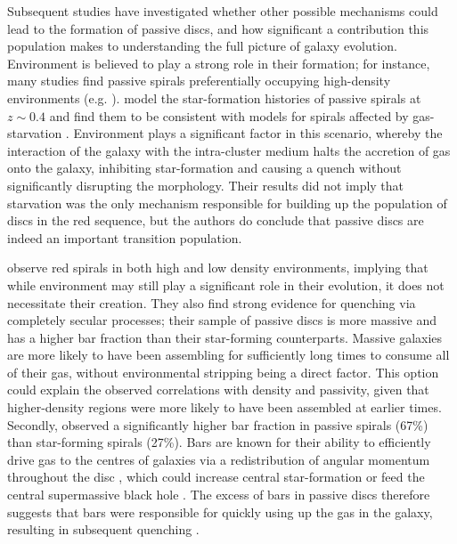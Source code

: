 \documentclass[useAMS,usenatbib]{mn2e}
\begin{document}
Subsequent studies have investigated whether other possible mechanisms could lead to the formation of passive discs, and how significant a contribution this population makes to understanding the full picture of galaxy evolution. Environment is believed to play a strong role in their formation; for instance, many studies find passive spirals preferentially occupying high-density environments (e.g. \citet{Dressler1999, Poggianti1999, Goto2003, Deng2009, Hughes2009, Fraser-McKelvie2017}). \citet{Moran2006} model the star-formation histories of passive spirals at $z\sim0.4$ and find them to be consistent with models for spirals affected by gas-starvation \citep{Larson1980, Quilis2000, Bekki2002}. Environment plays a significant factor in this scenario, whereby the interaction of the galaxy with the intra-cluster medium halts the accretion of gas onto the galaxy, inhibiting star-formation and causing a quench without significantly disrupting the morphology. Their results did not imply that starvation was the only mechanism responsible for building up the population of discs in the red sequence, but the authors do conclude that passive discs are indeed an important transition population.

\citet{Masters2010} observe red spirals in both high and low density environments, implying that while environment may still play a significant role in their evolution, it does not necessitate their creation. They also find strong evidence for quenching via completely secular processes; their sample of passive discs is more massive and has a higher bar fraction than their star-forming counterparts. Massive galaxies are more likely to have been assembling for sufficiently long times to consume all of their gas, without environmental stripping being a direct factor. This option could explain the observed correlations with density and passivity, given that higher-density regions were more likely to have been assembled at earlier times. Secondly, \citet{Masters2010} observed a significantly higher bar fraction in passive spirals (67\%) than star-forming spirals (27\%). Bars are known for their ability to efficiently drive gas to the centres of galaxies via a redistribution of angular momentum throughout the disc \citep{Sellwood1993,Shlosman1989,Ann2005}, which could increase central star-formation \citep{Hawarden1986,Ho1997} or feed the central supermassive black hole \citep{Athanassoula1992,Friedli1993,Galloway2015}. The excess of bars in passive discs therefore suggests that bars were responsible for quickly using up the gas in the galaxy, resulting in subsequent quenching \citep{Masters2011}. 
\end{document}
